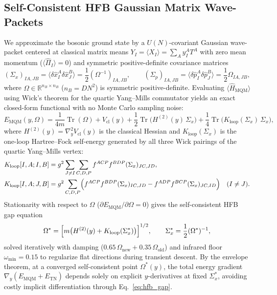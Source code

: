 \documentclass[11pt,a4paper]{article}
\DeclareMathOperator{\Tr}{Tr}
\begin{document}
\subsection{Self-Consistent HFB Gaussian Matrix Wave-Packets}
We approximate the bosonic ground state by a $U(N)$-covariant Gaussian wave-packet centered at classical matrix means $Y_I = \langle \hat{X}_I \rangle = \sum_A y_I^A T^A$ with zero mean momentum ($\langle \hat{\Pi}_I \rangle = 0$) and symmetric positive-definite covariance matrices
\begin{equation}
  (\Sigma_x)_{IA,JB} = \langle \delta\hat{x}_I^A \delta\hat{x}_J^B \rangle = \frac{1}{2}(\Omega^{-1})_{IA,JB},
  \qquad
  (\Sigma_p)_{IA,JB} = \langle \delta\hat{p}_I^A \delta\hat{p}_J^B \rangle = \frac{1}{2}\Omega_{IA,JB},
  \label{eq:hfb_cov}
\end{equation}
where $\Omega \in \mathbb{R}^{n_B \times n_B}$ ($n_B = D N^2$) is symmetric positive-definite. Evaluating $\langle \hat{H}_{\mathrm{MQM}} \rangle$ using Wick's theorem for the quartic Yang--Mills commutator yields an exact closed-form functional with no Monte Carlo sampling noise:
\begin{equation}
  E_{\mathrm{MQM}}(y, \Omega) = \frac{1}{4m}\Tr(\Omega) + V_{\mathrm{cl}}(y)
  + \frac{1}{2}\Tr\!\big(H^{(2)}(y)\,\Sigma_x\big)
  + \frac{1}{4}\Tr\!\big(K_{\mathrm{loop}}(\Sigma_x)\,\Sigma_x\big),
  \label{eq:Emqm_hfb}
\end{equation}
where $H^{(2)}(y) = \nabla_y^2 V_{\mathrm{cl}}(y)$ is the classical Hessian and $K_{\mathrm{loop}}(\Sigma_x)$ is the one-loop Hartree--Fock self-energy generated by all three Wick pairings of the quartic Yang--Mills vertex:
\begin{align}
  K_{\mathrm{loop}}[I,A; I,B] &= g^2 \sum_{J \neq I} \sum_{C,D,P} f^{ACP} f^{BDP} (\Sigma_x)_{JC,JD}, \label{eq:Kloop_diag}\\
  K_{\mathrm{loop}}[I,A; J,B] &= g^2 \sum_{C,D,P} \Bigl(
    f^{ACP} f^{BDP} (\Sigma_x)_{IC,JD}
    - f^{ADP} f^{BCP} (\Sigma_x)_{JC,ID}
  \Bigr) \quad (I \neq J). \label{eq:Kloop_offdiag}
\end{align}
Stationarity with respect to $\Omega$ ($\partial E_{\mathrm{MQM}}/\partial\Omega = 0$) gives the self-consistent HFB gap equation
\begin{equation}
  \Omega^* = \Bigl[m\big(H^{(2)}(y) + K_{\mathrm{loop}}(\Sigma_x^*)\big)\Bigr]^{1/2},
  \qquad \Sigma_x^* = \frac{1}{2}(\Omega^*)^{-1},
  \label{eq:hfb_gap}
\end{equation}
solved iteratively with damping ($0.65\,\Omega_{\mathrm{new}} + 0.35\,\Omega_{\mathrm{old}}$) and infrared floor $\omega_{\min} = 0.15$ to regularize flat directions during transient descent. By the envelope theorem, at a converged self-consistent point $\Omega^*(y)$, the total energy gradient $\nabla_y (E_{\mathrm{MQM}} + E_{\mathrm{TN}})$ depends solely on explicit $y$-derivatives at fixed $\Sigma_x^*$, avoiding costly implicit differentiation through Eq.~\eqref{eq:hfb_gap}.
\end{document}
